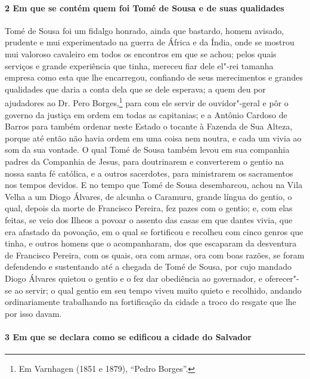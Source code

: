 \paragraph{2 Em que se contém quem foi Tomé de Sousa e de suas qualidades}

Tomé de Sousa foi um fidalgo honrado, ainda que bastardo, homem avisado, prudente e mui
experimentado na guerra de África e da Índia, onde se mostrou mui valoroso cavaleiro em
todos os encontros em que se achou; pelos quais serviços e grande experiência que tinha,
mereceu fiar dele el"-rei tamanha empresa como esta que lhe encarregou, confiando de seus
merecimentos e grandes qualidades que daria a conta dela que se dele esperava; a quem deu
por ajudadores ao Dr. Pero Borges,\footnote{ Em Varnhagen (1851 e 1879), ``Pedro
Borges''.} para com ele servir de ouvidor"-geral e pôr o governo da justiça em ordem em
todas as capitanias; e a Antônio Cardoso de Barros para também ordenar neste Estado o
tocante à Fazenda de Sua Alteza, porque até então não havia ordem em uma coisa nem noutra,
e cada um vivia ao som da sua vontade. O qual Tomé de Sousa também levou em sua companhia
padres da Companhia de Jesus, para doutrinarem e converterem o gentio na nossa santa fé
católica, e a outros sacerdotes, para ministrarem os sacramentos nos tempos devidos. E no
tempo que Tomé de Sousa desembarcou, achou na Vila Velha a um Diogo Álvares, de alcunha o
Caramuru, grande língua do gentio, o qual, depois da morte de Francisco Pereira, fez pazes
com o gentio; e, com elas feitas, se veio dos Ilheos a povoar o assento das casas em que
dantes vivia, que era afastado da povoação, em o qual se fortificou e recolheu com cinco
genros que tinha, e outros homens que o acompanharam, dos que escaparam da desventura de
Francisco Pereira, com os quais, ora com armas, ora com boas razões, se foram defendendo e
sustentando até a chegada de Tomé de Sousa, por cujo mandado Diogo Álvares quietou o
gentio e o fez dar obediência ao governador, e oferecer"-se ao servir; o qual gentio em seu
tempo viveu muito quieto e recolhido, andando ordinariamente trabalhando na fortificação
da cidade a troco do resgate que lhe por isso davam.

\paragraph{3 Em que se declara como se edificou a cidade do Salvador}

